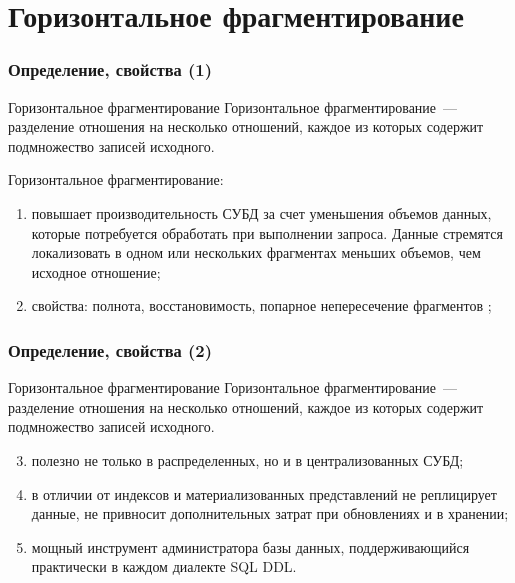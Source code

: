 \documentclass[unicode]{beamer}
\begin{document}
\section{Горизонтальное фрагментирование}

\begin{frame}
\frametitle{Определение, свойства (1)}

\begin{block}{Горизонтальное фрагментирование}
Горизонтальное фрагментирование~--- разделение отношения на несколько отношений, каждое из которых содержит подмножество записей исходного.
\end{block}


Горизонтальное фрагментирование:
\begin{enumerate}
  \item повышает производительность СУБД за счет уменьшения объемов данных, которые потребуется обработать при выполнении запроса. Данные стремятся локализовать в одном или нескольких фрагментах меньших объемов, чем исходное отношение;
  \item свойства: полнота, восстановимость, попарное непересечение фрагментов \cite{p15};
\end{enumerate}

\end{frame}


\begin{frame}
\frametitle{Определение, свойства (2)}

\begin{block}{Горизонтальное фрагментирование}
Горизонтальное фрагментирование~--- разделение отношения на несколько отношений, каждое из которых содержит подмножество записей исходного.
\end{block}

\begin{enumerate}
  \setcounter{enumi}{2}
  \item полезно не только в распределенных, но и в централизованных СУБД;
  \item в отличии от индексов и материализованных представлений не реплицирует данные, не привносит дополнительных затрат при обновлениях и в хранении;
  \item мощный инструмент администратора базы данных, поддерживающийся практически в каждом диалекте SQL DDL.

\end{enumerate}

\end{frame}
\end{document}
